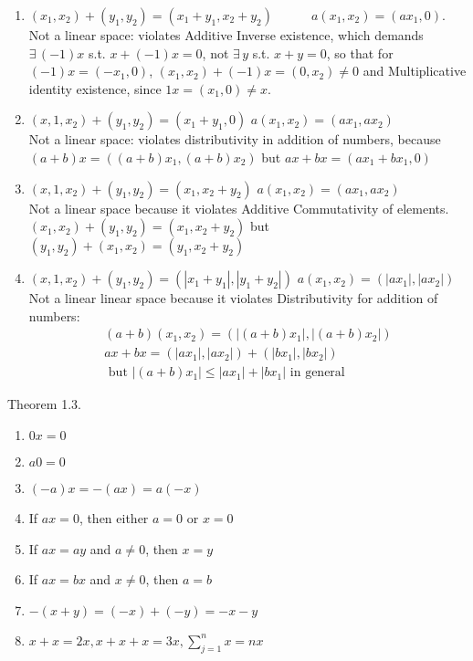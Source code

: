 \documentclass[twoside]{amsart}
\theoremstyle{plain}
\theoremstyle{definition}
\newcommand{\exercisehead}[1]
  {
   \noindent{\small\bf Exercise #1.}
   \smallskip}
\begin{document}
\exercisehead{31}
\begin{enumerate}
  \item $(x_1,x_2) + (y_1,y_2) = (x_1 + y_1, x_2 + y_2) \quad \quad \quad a(x_1,x_2) = (ax_1,0)$.  \\
Not a linear space: violates Additive Inverse existence, which demands $\exists \, (-1)x$ s.t. $x+(-1)x =0$, not $\exists \, y$ s.t. $x+y=0$, so that for $(-1)x = (-x_1,0)$, $(x_1,x_2) + (-1)x = (0,x_2) \neq 0$ and Multiplicative identity existence, since $1x = (x_1,0) \neq x$.  \medskip 
  \item $(x,1,x_2) + (y_1,y_2) = (x_1+y_1,0)$ \quad \quad \quad $a(x_1,x_2) = (ax_1, ax_2)$\\
Not a linear space: violates distributivity in addition of numbers, because \\
$(a+b)x = ((a+b)x_1,(a+b)x_2)$ but $ax + bx = (ax_1 + bx_1,0)$ \medskip 
  \item $(x,1,x_2) + (y_1,y_2) = (x_1,x_2+y_2)$ \quad \quad \quad $a(x_1,x_2) = (ax_1, ax_2)$ \\
Not a linear space because it violates Additive Commutativity of elements.
$(x_1,x_2) + (y_1, y_2) = (x_1, x_2+y_2)$ but \\
$(y_1,y_2) + (x_1,x_2) = (y_1,x_2 +y_2)$  \medskip 
  \item $(x,1,x_2) + (y_1,y_2) = (|x_1+y_1|,|y_1+y_2|)$ \quad \quad \quad $a(x_1,x_2) = (|ax_1|, |ax_2|)$ \\
Not a linear linear space because it violates Distributivity for addition of numbers: 
\[
\begin{gathered}
  (a+b)(x_1,x_2) = (|(a+b)x_1|, |(a+b)x_2|) \\
  ax+bx = (|ax_1|,|ax_2|) + (|bx_1|,|bx_2|) \\
\text{ but } |(a+b)x_1 |\leq |ax_1| + |bx_1| \text{ in general }
\end{gathered}
\]
\end{enumerate}

\exercisehead{32} Theorem 1.3. 
\begin{enumerate}
\item $0x = 0$ 
\item $a0=0$ 
\item $(-a)x = -(ax) = a(-x)$
\item If $ax=0$, then either $a=0$ or $x=0$ 
\item If $ax = ay$ and $a\neq 0$, then $x=y$
\item If $ax = bx$ and $x\neq 0$, then $a=b$
\item $-(x+y) = (-x) + (-y) = -x-y$ 
\item $x+x=2x,x+x+x=3x, \sum_{j=1}^n x = nx$
\end{enumerate} \quad \smallskip
\end{document}
